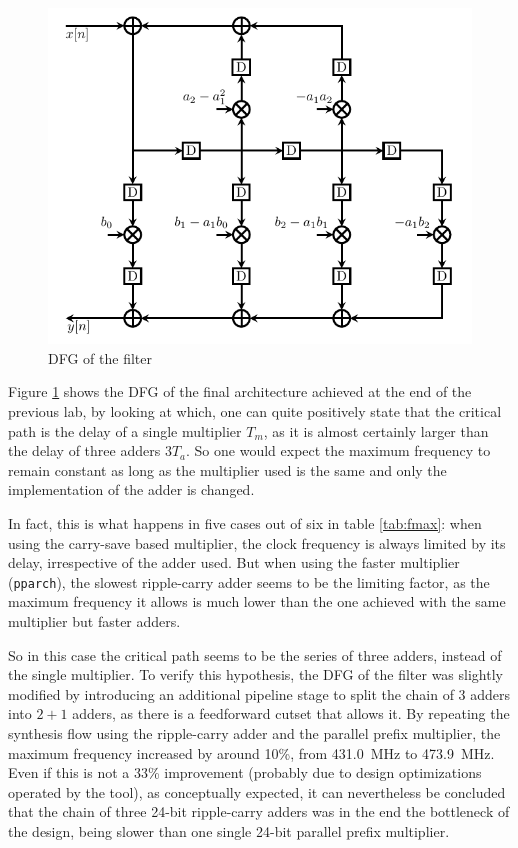 \documentclass[a4paper]{article}
\begin{document}
\begin{figure}[hbtp]
	\centering
	\includegraphics[width=.6\linewidth]{media/pipelined_lookahead_dfg.pdf}
	\caption{DFG of the filter}
	\label{fig:dfg}
\end{figure}
Figure \ref{fig:dfg} shows the DFG of the final architecture achieved at the end of the previous lab, by looking at which, one can quite positively state that the critical path is the delay of a single multiplier $T_m$, as it is almost certainly larger than the delay of three adders $3T_a$.
So one would expect the maximum frequency to remain constant as long as the multiplier used is the same and only the implementation of the adder is changed.

In fact, this is what happens in five cases out of six in table \ref{tab:fmax}: when using the carry-save based multiplier, the clock frequency is always limited by its delay, irrespective of the adder used. But when using the faster multiplier (\texttt{pparch}), the slowest ripple-carry adder seems to be the limiting factor, as the maximum frequency it allows is much lower than the one achieved with the same multiplier but faster adders.

So in this case the critical path seems to be the series of three adders, instead of the single multiplier. To verify this hypothesis, the DFG of the filter was slightly modified by introducing an additional pipeline stage to split the chain of $3$ adders into $2+1$ adders, as there is a feedforward cutset that allows it. By repeating the synthesis flow using the ripple-carry adder and the parallel prefix multiplier, the maximum frequency increased by around 10\%, from \SI{431.0}{\mega\hertz} to \SI{473.9}{\mega\hertz}. Even if this is not a 33\% improvement (probably due to design optimizations operated by the tool), as conceptually expected, it can nevertheless be concluded that the chain of three 24-bit ripple-carry adders was in the end the bottleneck of the design, being slower than one single 24-bit parallel prefix multiplier.
\end{document}
